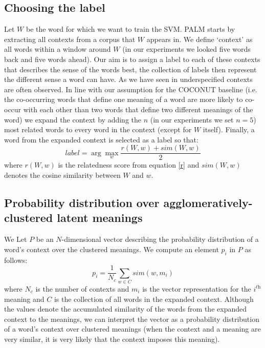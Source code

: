 \documentclass[11pt]{article}
\begin{document}
\subsection{Choosing the label}
Let $W$ be the word for which we want to train the SVM. PALM starts by extracting all contexts from a corpus that $W$ appears in. We define `context' as all words within a window around $W$ (in our experiments we looked five words back and five words ahead). Our aim is to assign a label to each of these contexts that describes the sense of the words best, the collection of labels then represent the different sense a word can have. As we have seen in \cite{analysis} underspecified contexts are often observed. In line with our assumption for the COCONUT baseline (i.e. the co-occurring words that define one meaning of a word are more likely to co-occur with each other than two words that define two different meanings of the word) we expand the context by adding the $n$ (in our experiments we set $n=5$) most related words to every word in the context (except for $W$ itself). Finally, a word from the expanded context is selected as a label so that:
\begin{equation}\label{label}label = \arg\max_w \frac{r(W, w) + \textit{sim}(W, w)}{2}\end{equation}
where $r(W, w)$ is the relatedness score from equation \ref{r} and $\textit{sim}(W, w)$ denotes the cosine similarity between $W$ and $w$. 

\subsection{Probability distribution over agglomeratively-clustered latent meanings}
We Let $P$ be an $N$-dimensional vector describing the probability distribution of a word's context over the clustered meanings. We compute an element $p_i$ in $P$ as follows:
\begin{equation}\label{pa}p_i = \frac{1}{N_c}\sum\limits_{w\in C}sim(w, m_i)\end{equation}
where $N_c$ is the number of contexts and $m_i$ is the vector representation for the $i^{\textit{th}}$ meaning and $C$ is the collection of all words in the expanded context. 
Although the values denote the accumulated similarity of the words from the expanded context to the meanings, we can interpret the vector as a probability distribution of a word's context over clustered meanings (when the context and a meaning are very similar, it is very likely that the context imposes this meaning). 
\end{document}
